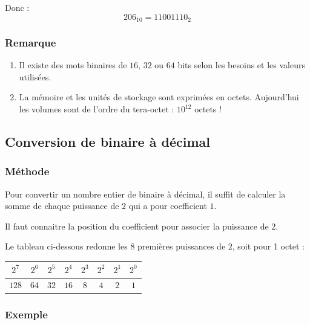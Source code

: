 \documentclass[11pt]{article}
\providecommand{\tightlist}{%
      \setlength{\itemsep}{0pt}\setlength{\parskip}{0pt}}
\begin{document}
Donc : \[206_{10}=11001110_{2}\]

\hypertarget{remarque}{%
\subsubsection*{Remarque}\label{remarque}}

\begin{enumerate}
\def\labelenumi{\arabic{enumi}.}
\tightlist
\item
  Il existe des mots binaires de \(16\), \(32\) ou \(64\) bits selon les
  besoins et les valeurs utilisées.
\item
  La mémoire et les unités de stockage sont exprimées en octets.
  Aujourd'hui les volumes sont de l'ordre du tera-octet : \(10^{12}\)
  octets !
\end{enumerate}

    \hypertarget{conversion-de-binaire-uxe0-duxe9cimal}{%
\subsection{Conversion de binaire à
décimal}\label{conversion-de-binaire-uxe0-duxe9cimal}}

\hypertarget{muxe9thode}{%
\subsubsection*{Méthode}\label{muxe9thode}}

Pour convertir un nombre entier de binaire à décimal, il suffit de
calculer la somme de chaque puissance de \(2\) qui a pour coefficient
\(1\).

Il faut connaitre la position du coefficient pour associer la puissance
de \(2\).

Le tableau ci-dessous redonne les \(8\) premières puissances de \(2\),
soit pour 1 octet :

\begin{longtable}[]{@{}cccccccc@{}}
\toprule
\(2^{7}\) & \(2^{6}\) & \(2^{5}\) & \(2^{4}\) & \(2^{3}\) & \(2^{2}\) &
\(2^{1}\) & \(2^{0}\)\tabularnewline
\midrule
\endhead
\(128\) & \(64\) & \(32\) & \(16\) & \(8\) & \(4\) & \(2\) &
\(1\)\tabularnewline
\bottomrule
\end{longtable}

\hypertarget{exemple}{%
\subsubsection*{Exemple}\label{exemple}}
\end{document}
